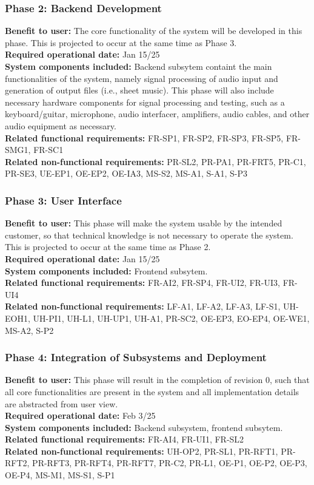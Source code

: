 \documentclass[12pt]{article}
\begin{document}
\subsubsection*{Phase 2: Backend Development}
\textbf{Benefit to user:} The core functionality of the system will be developed in this phase. This is projected to occur at the same time as Phase 3.\\
\textbf{Required operational date:} Jan 15/25 \\
\textbf{System components included:} Backend subsytem containt the main functionalities of the system, namely signal processing of audio input and generation of output files (i.e., sheet music). 
                                     This phase will also include necessary hardware components for signal processing and testing, such as a keyboard/guitar, microphone, audio interfacer, amplifiers, audio cables, and other audio equipment as necessary.\\
\textbf{Related functional requirements:} FR-SP1, FR-SP2, FR-SP3, FR-SP5, FR-SMG1, FR-SC1\\
\textbf{Related non-functional requirements:} PR-SL2, PR-PA1, PR-FRT5, PR-C1, PR-SE3, UE-EP1, OE-EP2, OE-IA3, MS-S2, MS-A1, S-A1, S-P3 \\

\subsubsection*{Phase 3: User Interface}
\textbf{Benefit to user:} This phase will make the system usable by the intended customer, so that technical knowledge is not necessary to operate the system. This is projected to occur at the same time as Phase 2. \\
\textbf{Required operational date:} Jan 15/25 \\
\textbf{System components included:} Frontend subsytem. \\
\textbf{Related functional requirements:} FR-AI2, FR-SP4, FR-UI2, FR-UI3, FR-UI4\\
\textbf{Related non-functional requirements:} LF-A1, LF-A2, LF-A3, LF-S1, UH-EOH1, UH-PI1, UH-L1, UH-UP1, UH-A1, PR-SC2, OE-EP3, EO-EP4, OE-WE1, MS-A2, S-P2 \\

\subsubsection*{Phase 4: Integration of Subsystems and Deployment}
\textbf{Benefit to user:} This phase will result in the completion of revision 0, such that all core functionalities are present in the system and all implementation details are abstracted from user view. \\
\textbf{Required operational date:} Feb 3/25 \\
\textbf{System components included:} Backend subsystem, frontend subsytem.\\
\textbf{Related functional requirements:} FR-AI4, FR-UI1, FR-SL2\\
\textbf{Related non-functional requirements:} UH-OP2, PR-SL1, PR-RFT1, PR-RFT2, PR-RFT3, PR-RFT4, PR-RFT7, PR-C2, PR-L1, OE-P1, OE-P2, OE-P3, OE-P4, MS-M1, MS-S1, S-P1 \\
\end{document}
